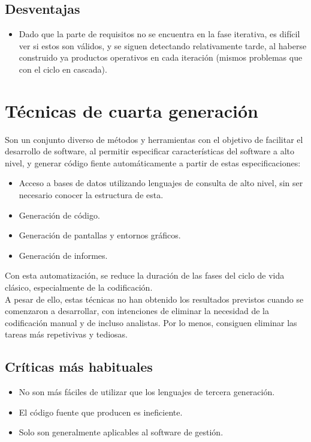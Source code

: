 \subsection{Desventajas}

\begin{itemize}
   \item Dado que la parte de requisitos no se encuentra en la fase iterativa, es difícil ver si estos son válidos, y se siguen detectando relativamente tarde, al haberse construido ya productos operativos en cada iteración (mismos problemas que con el ciclo en cascada).
\end{itemize}


\section{Técnicas de cuarta generación}

Son un conjunto diverso de métodos y herramientas con el objetivo de facilitar el desarrollo de software, al permitir especificar características del software a alto nivel, y generar código fiente automáticamente a partir de estas especificaciones:

\begin{itemize}
   \item Acceso a bases de datos utilizando lenguajes de consulta de alto nivel, sin ser necesario conocer la estructura de esta.
   \item Generación de código.
   \item Generación de pantallas y entornos gráficos.
   \item Generación de informes.
\end{itemize}

Con esta automatización, se reduce la duración de las fases del ciclo de vida clásico, especialmente de la codificación.\\

A pesar de ello, estas técnicas no han obtenido los resultados previstos cuando se comenzaron a desarrollar, con intenciones de eliminar la necesidad de la codificación manual y de incluso analistas. Por lo menos, consiguen eliminar las tareas más repetivivas y tediosas.

\subsection{Críticas más habituales}

\begin{itemize}
   \item No son más fáciles de utilizar que los lenguajes de tercera generación.
   \item El código fuente que producen es ineficiente.
   \item Solo son generalmente aplicables al software de gestión.
\end{itemize}


